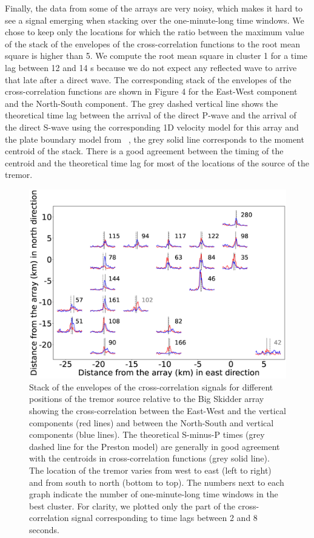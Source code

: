 \documentclass[draft]{agujournal2019}
\begin{document}
Finally, the data from some of the arrays are very noisy, which makes it hard to see a signal emerging when stacking over the one-minute-long time windows. We chose to keep only the locations for which the ratio between the maximum value of the stack of the envelopes of the cross-correlation functions to the root mean square is higher than 5. We compute the root mean square in cluster 1 for a time lag between 12 and 14 s because we do not expect any reflected wave to arrive that late after a direct wave. The corresponding stack of the envelopes of the cross-correlation functions are shown in Figure 4 for the East-West component and the North-South component. The grey dashed vertical line shows the theoretical time lag between the arrival of the direct P-wave and the arrival of the direct S-wave using the corresponding 1D velocity model for this array and the plate boundary model from ~, the grey solid line corresponds to the moment centroid of the stack. There is a good agreement between the timing of the centroid and the theoretical time lag for most of the locations of the source of the tremor. \\

\begin{figure}
\noindent\includegraphics[width=\textwidth, trim={2.5cm 0.5cm 5cm 1cm},clip]{figures/BS_PWS_PWS_0.eps}
\caption{Stack of the envelopes of the cross-correlation signals for different positions of the tremor source relative to the Big Skidder array showing the cross-correlation between the East-West and the vertical components (red lines) and between the North-South and vertical components (blue lines). The theoretical S-minus-P times (grey dashed line for the Preston model) are generally in good agreement with the centroids in cross-correlation functions (grey solid line). The location of the tremor varies from west to east (left to right) and from south to north (bottom to top). The numbers next to each graph indicate the number of one-minute-long time windows in the best cluster. For clarity, we plotted only the part of the cross-correlation signal corresponding to time lags between 2 and 8 seconds.}
\label{pngfiguresample}
\end{figure}
\end{document}
